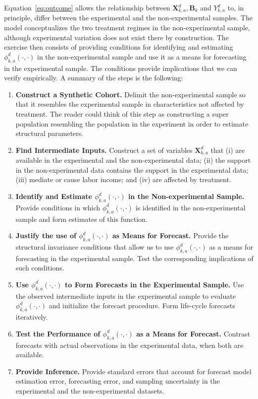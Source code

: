 \noindent Equation~\eqref{eq:outcome} allows the relationship between $\bm{X}^d_{k,a}, \bm{B}_k$ and $Y^d_{k,a}$ to, in principle, differ between the experimental and the non-experimental samples. The model conceptualizes the two treatment regimes in the non-experimental sample, although experimental variation does not exist there by construction. The exercise then consists of providing conditions for identifying and estimating $\phi^d_{k,a}\left( \cdot, \cdot \right)$ in the non-experimental sample and use it as a means for forecasting in the experimental sample. The conditions provide implications that we can verify empirically. A summary of the steps is the following: 

\begin{enumerate}
\item \textbf{Construct a Synthetic Cohort.} Delimit the non-experimental sample so that it resembles the experimental sample in characteristics not affected by treatment. The reader could think of this step as constructing a super population resembling the population in the experiment in order to estimate structural parameters.
\item \textbf{Find Intermediate Inputs.} Construct a set of variables $\bm{X}^d_{k,a}$ that (i) are available in the experimental and the non-experimental data; (ii) the support in the non-experimental data contains the support in the experimental data; (iii) mediate or cause labor income; and (iv) are affected by treatment.
\item \textbf{Identify and Estimate $\phi^d_{k,a}\left( \cdot, \cdot \right)$ in the Non-experimental Sample.} Provide conditions in which $\phi^d_{k,a}\left( \cdot, \cdot \right)$ is identified in the non-experimental sample and form estimates of this function.
\item \textbf{Justify the use of  $\phi^d_{k,a}\left( \cdot, \cdot \right)$ as Means for Forecast.} Provide the structural invariance conditions that allow us to use $\phi^d_{k,a}\left( \cdot, \cdot \right)$ as a means for forecasting in the experimental sample. Test the corresponding implications of such conditions.
\item \textbf{Use $\phi^d_{k,a}\left( \cdot, \cdot \right)$ to Form Forecasts in the Experimental Sample.} Use the observed intermediate inputs in the experimental sample to evaluate $\phi^d_{k,a}\left( \cdot, \cdot \right)$ and initialize the forecast procedure. Form life-cycle forecasts iteratively. 
\item \textbf{Test the Performance of $\phi^d_{k,a}\left( \cdot, \cdot \right)$  as a Means for Forecast.} Contrast forecasts with actual observations in the experimental data, when both are available.
\item \textbf{Provide Inference.} Provide standard errors that account for forecast model estimation error, forecasting error, and sampling uncertainty in the experimental and the non-experimental datasets. 
\end{enumerate}

